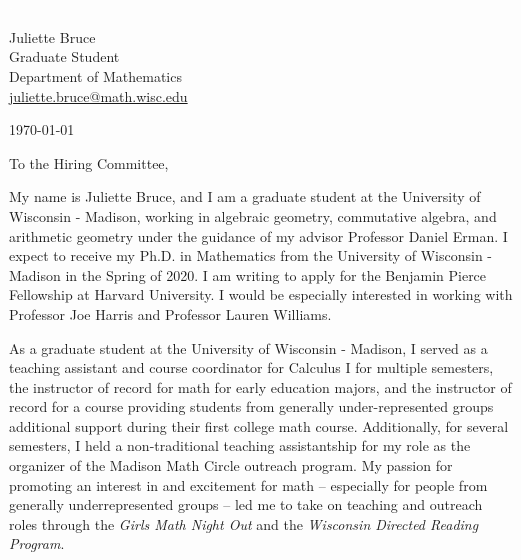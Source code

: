 \documentclass[11pt]{article}
\begin{document}
\section*{}

\noindent
\begin{minipage}{0.99\textwidth}
\begin{minipage}{0.69\textwidth}
\textcolor{white}{.}
\end{minipage}
\begin{minipage}{0.29\textwidth}
{
Juliette Bruce \\
Graduate Student \\
Department of Mathematics \\
\href{mailto:juliette.bruce@math.wisc.edu}{juliette.bruce@math.wisc.edu}
}

\vspace{12pt}
\today
\end{minipage}
\end{minipage}


\vspace{12pt}
\noindent
To the Hiring Committee,

My name is Juliette Bruce, and I am a graduate student at the University of Wisconsin - Madison, working in algebraic geometry, commutative algebra, and arithmetic geometry under the guidance of my advisor Professor Daniel Erman. I expect to receive my Ph.D. in Mathematics from the University of Wisconsin - Madison in the Spring of 2020. I am writing to apply for the Benjamin Pierce Fellowship at Harvard University. I would be especially interested in working with Professor Joe Harris and Professor Lauren Williams. 

As a graduate student at the University of Wisconsin - Madison, I served as a teaching assistant and course coordinator for Calculus I for multiple semesters, the instructor of record for math for early education majors, and the instructor of record for a course providing students from generally under-represented groups additional support during their first college math course. Additionally, for several semesters, I held a non-traditional teaching assistantship for my role as the organizer of the Madison Math Circle outreach program. My passion for promoting an interest in and excitement for math -- especially for people from generally underrepresented groups -- led me to take on teaching and outreach roles through the \textit{Girls Math Night Out} and the \textit{Wisconsin Directed Reading Program}. 
\end{document}

